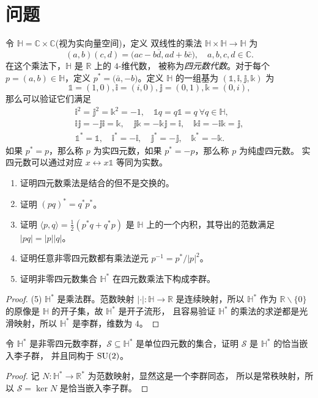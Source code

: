 \section{问题}

\begin{problem}{}{}
  令 $\mathbb{H}=\mathbb{C}\times \mathbb{C}$(视为实向量空间)，定义
  双线性的乘法 $\mathbb{H}\times \mathbb{H}\to \mathbb{H}$ 为
  \[
    (a,b)(c,d)=\bigl(ac-b\bar d,ad+b\bar c\bigr),\quad a,b,c,d\in \mathbb{C}.  
  \]
  在这个乘法下，$\mathbb{H}$ 是 $\mathbb{R}$ 上的 $4$-维代数，
  被称为\emph{四元数代数}。对于每个 $p=(a,b)\in \mathbb{H}$，定义
  $p^*=\bigl(\bar a,-b\bigr)$。定义 $\mathbb{H}$ 的一组基为
  $(\mathbb{1},\mathbb{i},\mathbb{j},\mathbb{k})$ 为
  \[
    \mathbb{1}=(1,0),\mathbb{i}=(i,0),\mathbb{j}=(0,1),\mathbb{k}=(0,i)  ,
  \]
  那么可以验证它们满足    
  \begin{gather*}
    \mathbb{i}^2=\mathbb{j}^2=\mathbb{k}^2=-1,\quad
    \mathbb{1}q=q \mathbb{1}=q\ \forall q\in \mathbb{H},\\
    \mathbb{ij}=-\mathbb{ji}=\mathbb{k},\quad \mathbb{jk}=-\mathbb{kj}=\mathbb{i},
    \quad \mathbb{ki}=-\mathbb{ik}=\mathbb{j},\\ 
    \mathbb{1}^*=\mathbb{1},\quad \mathbb{i}^*=-\mathbb{i},\quad \mathbb{j}^*=-\mathbb{j},
    \quad \mathbb{k}^*=-\mathbb{k}.
  \end{gather*}
  如果 $p^*=p$，那么称 $p$ 为实四元数，如果 $p^*=-p$，那么称 $p$ 为纯虚四元数。
  实四元数可以通过对应 $x\leftrightarrow x\mathbb{1}$ 等同为实数。
  \begin{enumerate}
    \item 证明四元数乘法是结合的但不是交换的。
    \item 证明 $(pq)^*=q^*p^*$。
    \item 证明 $\langle p,q\rangle=\frac{1}{2}(p^*q+q^*p)$ 是 $\mathbb{H}$
    上的一个内积，其导出的范数满足 $|pq|=|p||q|$。
    \item 证明任意非零四元数都有乘法逆元 $p^{-1}=p^*/|p|^2$。
    \item 证明非零四元数集合 $\mathbb{H}^*$ 在四元数乘法下构成李群。
  \end{enumerate} 
\end{problem}
\begin{proof}
  (5) $\mathbb{H}^*$ 是乘法群。范数映射 $|\cdot|:\mathbb{H}\to \mathbb{R}$
  是连续映射，所以 $\mathbb{H}^*$ 作为 $\mathbb{R}\smallsetminus\{0\}$
  的原像是 $\mathbb{H}$ 的开子集，故 $\mathbb{H}^*$ 是开子流形，
  且容易验证 $\mathbb{H}^*$ 的乘法的求逆都是光滑映射，所以 
  $\mathbb{H}^*$ 是李群，维数为 $4$。
\end{proof}

\begin{problem}{}{}
  令 $\mathbb{H}^*$ 是非零四元数李群，$\mathcal{S}\subseteq \mathbb{H}^*$
  是单位四元数的集合，证明 $\mathcal{S}$ 是 $\mathbb{H}^*$ 的恰当嵌入李子群，
  并且同构于 $\operatorname{SU}(2)$。
\end{problem}
\begin{proof}
  记 $N:\mathbb{H}^*\to \mathbb{R}^*$ 为范数映射，显然这是一个李群同态，
  所以是常秩映射，所以 $\mathcal{S}=\ker N$ 是恰当嵌入李子群。
\end{proof}
